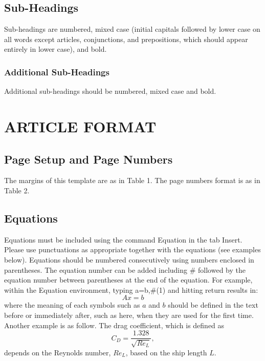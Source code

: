 \documentclass[A4paper,11pt]{marine_2023_Paper}
\begin{document}
\subsection{Sub-Headings}

Sub-headings are numbered, mixed case (initial capitals followed by lower case on all words except articles, conjunctions, and prepositions, which should appear entirely in lower case), and bold.

\subsubsection {Additional Sub-Headings}

Additional sub-headings should be numbered, mixed case and bold.

\section{ARTICLE FORMAT}
\subsection{Page Setup and Page Numbers}

The margins of this template are as in Table 1. The page numbers format is as in Table 2.

\subsection{Equations}

Equations must be included using the command Equation in the tab Insert. Please use punctuations as appropriate together with the equations (see examples below). Equations should be numbered consecutively using numbers enclosed in parentheses. The equation number can be added including \# followed by the equation number between parentheses at the end of the equation. For example, within the Equation environment, typing a=b,\#(1) and hitting return results in:
\begin{equation}
Ax = b
\label{eq1}
\end{equation}
where the meaning of each symbols such as $a$ and $b$ should be defined in the text before or immediately after, such as here, when they are used for the first time. Another example is as follow. The drag coefficient, which is defined as
\begin{equation}
C_D=\frac{1.328}{\sqrt{Re_L}},
\label{eq2}
\end{equation}
depends on the Reynolds number, $Re_L$, based on the ship length $L$.
\end{document}
